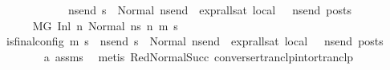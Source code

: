 \begin{isabellebody}
\ \ \ \ \ \ \ \ \ \ \ \ {\isacharparenleft}{\kern0pt}{\isasymforall}ns{\isacharunderscore}{\kern0pt}end{\isachardot}{\kern0pt}\ s{}\ {\isacharequal}{\kern0pt}\ Normal\ ns{\isacharunderscore}{\kern0pt}end\ {\isasymlongrightarrow}\ {\isacharparenleft}{\kern0pt}expr{\isacharunderscore}{\kern0pt}all{\isacharunderscore}{\kern0pt}sat\ {\isasymLambda}{}{\isacharunderscore}{\kern0pt}local\ {\isasymGamma}\ {\isasymOmega}\ ns{\isacharunderscore}{\kern0pt}end{\isacharparenright}{\kern0pt}\ posts{\isacharparenright}{\kern0pt}{\isacharparenright}{\kern0pt}{\isachardoublequoteclose}\ \isanewline
\ \ \isamarkupfalse%
\ {\isacharminus}{\kern0pt}\isanewline
\ \ \ \ \isamarkupfalse%
\ {\isachardoublequoteopen}{\isacharparenleft}{\kern0pt}M{\isacharcomma}{\kern0pt}{\isasymLambda}{\isacharcomma}{\kern0pt}{\isasymGamma}{\isacharcomma}{\kern0pt}{\isasymOmega}{\isacharcomma}{\kern0pt}G\ {\isasymturnstile}{\isacharparenleft}{\kern0pt}Inl\ n{}{\isacharcomma}{\kern0pt}\ Normal\ ns{}{\isacharparenright}{\kern0pt}\ {\isacharminus}{\kern0pt}n{\isasymrightarrow}{\isacharasterisk}{\kern0pt}\ {\isacharparenleft}{\kern0pt}m{}{\isacharcomma}{\kern0pt}\ s{}{\isacharparenright}{\kern0pt}{\isacharparenright}{\kern0pt}{\isachardoublequoteclose}\isanewline
\ \ \ \ \isamarkupfalse%
\ {\isachardoublequoteopen}{\isacharparenleft}{\kern0pt}is{\isacharunderscore}{\kern0pt}final{\isacharunderscore}{\kern0pt}config\ {\isacharparenleft}{\kern0pt}m{}{\isacharcomma}{\kern0pt}\ s{}{\isacharparenright}{\kern0pt}\ {\isasymLongrightarrow}\ {\isacharparenleft}{\kern0pt}{\isasymforall}ns{\isacharunderscore}{\kern0pt}end{\isachardot}{\kern0pt}\ s{}\ {\isacharequal}{\kern0pt}\ Normal\ ns{\isacharunderscore}{\kern0pt}end\ {\isasymlongrightarrow}\ {\isacharparenleft}{\kern0pt}expr{\isacharunderscore}{\kern0pt}all{\isacharunderscore}{\kern0pt}sat\ {\isasymLambda}{}{\isacharunderscore}{\kern0pt}local\ {\isasymGamma}\ {\isasymOmega}\ ns{\isacharunderscore}{\kern0pt}end{\isacharparenright}{\kern0pt}\ posts{\isacharparenright}{\kern0pt}{\isacharparenright}{\kern0pt}{\isachardoublequoteclose}\ \isanewline
\ \ \ \ \ \ \isamarkupfalse%
\ a{}\ assms\ \isamarkupfalse%
\ {\isacharparenleft}{\kern0pt}metis\ RedNormalSucc\ converse{\isacharunderscore}{\kern0pt}rtranclp{\isacharunderscore}{\kern0pt}into{\isacharunderscore}{\kern0pt}rtranclp{\isacharparenright}{\kern0pt}\isanewline
\ \ \isamarkupfalse%

\end{isabellebody}
